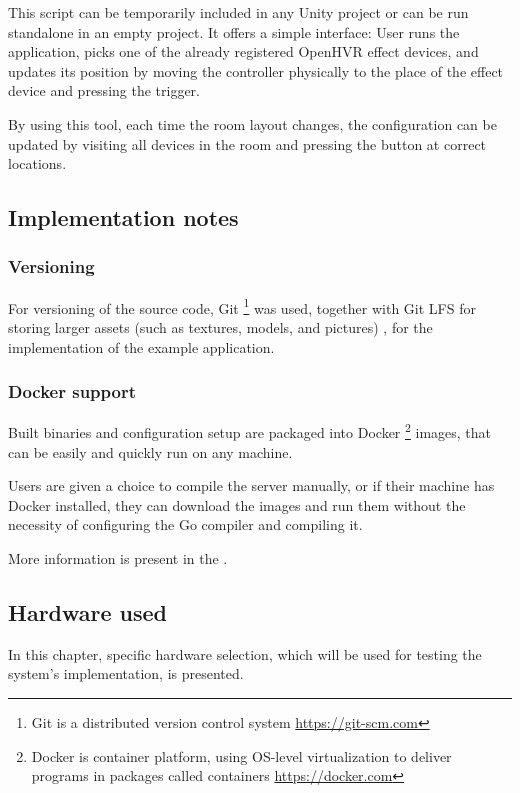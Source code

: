 This script can be temporarily included in any Unity project or can be run
standalone in an empty project. It offers a simple interface:
User runs the application, picks one of the already registered OpenHVR
effect devices, and updates its position by moving the controller physically
to the place of the effect device and pressing the trigger.


By using this tool, each time the room layout changes, the configuration can
be updated by visiting all devices in the room and pressing the button at
correct locations.


\hypertarget{x-implementation-notes}{\subsection*{Implementation notes}}
\hypertarget{x-versioning}{\subsubsection*{Versioning}}
For versioning of the source code, Git
\footnote{Git is a distributed version control system \href{https://git-scm.com}{https://git-scm.com}}
was used, together with Git LFS for
storing larger assets (such as textures, models, and pictures)
, for the implementation of the example application.


\hypertarget{x-docker-support}{\subsubsection*{Docker support}}
Built binaries and configuration setup are packaged into Docker
\footnote{Docker is container platform, using OS-level virtualization to deliver programs in packages called containers \href{https://docker.com}{https://docker.com}}
images, that can be easily and quickly run on any machine.


Users are given a choice to compile the server manually, or if their machine has
Docker installed, they can download the images and run them without
the necessity of configuring the Go compiler and compiling it.


More information is present in the \hyperlink{13-install-guide}{}.


\hypertarget{x-hardware-used}{\subsection*{Hardware used}}
In this chapter, specific hardware selection, which will be used for testing the
system’s implementation, is presented.


